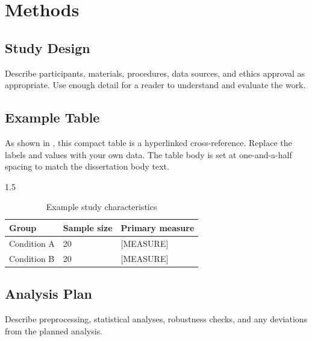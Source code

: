 \chapter{Methods}\label{chap:methods}

\section{Study Design}

Describe participants, materials, procedures, data sources, and ethics approval as appropriate. Use enough detail for a reader to understand and evaluate the work.

\section{Example Table}

As shown in , this compact table is a hyperlinked cross-reference. Replace the labels and values with your own data. The table body is set at one-and-a-half spacing to match the dissertation body text.

\begin{table}[H]
  \centering
  \caption{Example study characteristics}
  \label{tab:example}
  \begin{spacing}{1.5}
  \begin{tabular}{lll}
    \toprule
    Group & Sample size & Primary measure \\
    \midrule
    Condition A & 20 & [MEASURE] \\
    Condition B & 20 & [MEASURE] \\
    \bottomrule
  \end{tabular}
  \end{spacing}
\end{table}

\section{Analysis Plan}

Describe preprocessing, statistical analyses, robustness checks, and any deviations from the planned analysis.
